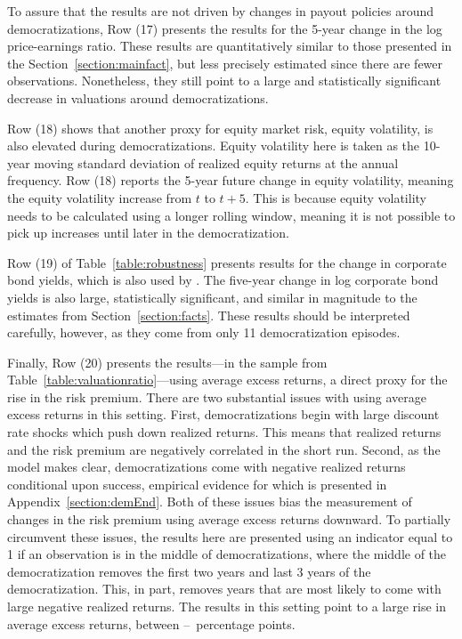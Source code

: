 \documentclass[12pt]{article}
\numberwithin{equation}{section}
\begin{document}
To assure that the results are not driven by changes in payout policies around democratizations, Row (17) presents the results for the 5-year change in the log price-earnings ratio. These results are quantitatively similar to those presented in the Section~\ref{section:mainfact}, but less precisely estimated since there are fewer observations. Nonetheless, they still point to a large and statistically significant decrease in valuations around democratizations.

Row (18) shows that another proxy for equity market risk, equity volatility, is also elevated during democratizations. Equity volatility here is taken as the 10-year moving standard deviation of realized equity returns at the annual frequency. Row (18) reports the 5-year future change in equity volatility, meaning the equity volatility increase from $t$ to $t+5$. This is because equity volatility needs to be calculated using a longer rolling window, meaning it is not possible to pick up increases until later in the democratization.

Row (19) of Table~\ref{table:robustness} presents results for the change in corporate bond yields, which is also used by \cite{Muir2017}. The five-year change in log corporate bond yields is also large, statistically significant, and similar in magnitude to the estimates from Section~\ref{section:facts}. These results should be interpreted carefully, however, as they come from only 11 democratization episodes.

Finally, Row (20) presents the results---in the sample from Table~\ref{table:valuationratio}---using average excess returns, a direct proxy for the rise in the risk premium. There are two substantial issues with using average excess returns in this setting. First, democratizations begin with large discount rate shocks which push down realized returns. This means that realized returns and the risk premium are negatively correlated in the short run. Second, as the model makes clear, democratizations come with negative realized returns conditional upon success, empirical evidence for which is presented in Appendix~\ref{section:demEnd}. Both of these issues bias the measurement of changes in the risk premium using average excess returns downward. To partially circumvent these issues, the results here are presented using an indicator equal to 1 if an observation is in the middle of democratizations, where the middle of the democratization removes the first two years and last 3 years of the democratization. This, in part, removes years that are most likely to come with large negative realized returns. The results in this setting point to a large rise in average excess returns, between \tabBThreeExcRetLow\---\tabBThreeExcRetHigh\ percentage points.
\end{document}
